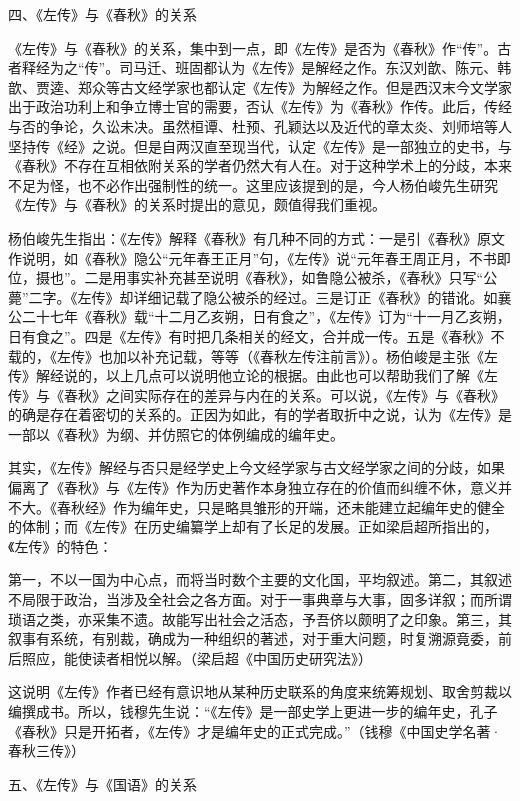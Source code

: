\documentclass[a4paper,12pt,UTF8,twoside]{ctexbook}
\begin{document}
四、《左传》与《春秋》的关系

《左传》与《春秋》的关系，集中到一点，即《左传》是否为《春秋》作“传”。古者释经为之“传”。司马迁、班固都认为《左传》是解经之作。东汉刘歆、陈元、韩歆、贾逵、郑众等古文经学家也都认定《左传》为解经之作。但是西汉末今文学家出于政治功利上和争立博士官的需要，否认《左传》为《春秋》作传。此后，传经与否的争论，久讼未决。虽然桓谭、杜预、孔颖达以及近代的章太炎、刘师培等人坚持传《经》之说。但是自两汉直至现当代，认定《左传》是一部独立的史书，与《春秋》不存在互相依附关系的学者仍然大有人在。对于这种学术上的分歧，本来不足为怪，也不必作出强制性的统一。这里应该提到的是，今人杨伯峻先生研究《左传》与《春秋》的关系时提出的意见，颇值得我们重视。

杨伯峻先生指出：《左传》解释《春秋》有几种不同的方式：一是引《春秋》原文作说明，如《春秋》隐公“元年春王正月”句，《左传》说“元年春王周正月，不书即位，摄也”。二是用事实补充甚至说明《春秋》，如鲁隐公被杀，《春秋》只写“公薨”二字。《左传》却详细记载了隐公被杀的经过。三是订正《春秋》的错讹。如襄公二十七年《春秋》载“十二月乙亥朔，日有食之”，《左传》订为“十一月乙亥朔，日有食之”。四是《左传》有时把几条相关的经文，合并成一传。五是《春秋》不载的，《左传》也加以补充记载，等等（《春秋左传注前言》）。杨伯峻是主张《左传》解经说的，以上几点可以说明他立论的根据。由此也可以帮助我们了解《左传》与《春秋》之间实际存在的差异与内在的关系。可以说，《左传》与《春秋》的确是存在着密切的关系的。正因为如此，有的学者取折中之说，认为《左传》是一部以《春秋》为纲、并仿照它的体例编成的编年史。

其实，《左传》解经与否只是经学史上今文经学家与古文经学家之间的分歧，如果偏离了《春秋》与《左传》作为历史著作本身独立存在的价值而纠缠不休，意义并不大。《春秋经》作为编年史，只是略具雏形的开端，还未能建立起编年史的健全的体制；而《左传》在历史编纂学上却有了长足的发展。正如梁启超所指出的，《左传》的特色：

第一，不以一国为中心点，而将当时数个主要的文化国，平均叙述。第二，其叙述不局限于政治，当涉及全社会之各方面。对于一事典章与大事，固多详叙；而所谓琐语之类，亦采集不遗。故能写出社会之活态，予吾侪以颇明了之印象。第三，其叙事有系统，有别裁，确成为一种组织的著述，对于重大问题，时复溯源竟委，前后照应，能使读者相悦以解。（梁启超《中国历史研究法》）

这说明《左传》作者已经有意识地从某种历史联系的角度来统筹规划、取舍剪裁以编撰成书。所以，钱穆先生说：“《左传》是一部史学上更进一步的编年史，孔子《春秋》只是开拓者，《左传》才是编年史的正式完成。”（钱穆《中国史学名著·春秋三传》）

五、《左传》与《国语》的关系
\end{document}
